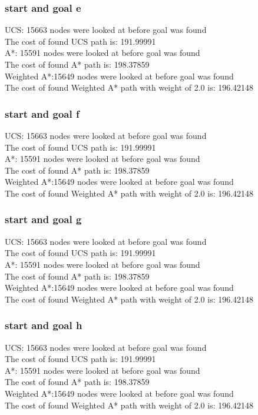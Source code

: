 \documentclass[11pt]{article} %
\begin{document}
\subsubsection{start and goal e}
UCS: 15663 nodes were looked at before goal was found\\
The cost of found UCS path is: 191.99991\\
A*: 15591 nodes were looked at before goal was found\\
The cost of found A* path is: 198.37859\\
Weighted A*:15649 nodes were looked at before goal was found\\
The cost of found Weighted A* path with weight of 2.0 is: 196.42148
\subsubsection{start and goal f}
UCS: 15663 nodes were looked at before goal was found\\
The cost of found UCS path is: 191.99991\\
A*: 15591 nodes were looked at before goal was found\\
The cost of found A* path is: 198.37859\\
Weighted A*:15649 nodes were looked at before goal was found\\
The cost of found Weighted A* path with weight of 2.0 is: 196.42148
\subsubsection{start and goal g}
UCS: 15663 nodes were looked at before goal was found\\
The cost of found UCS path is: 191.99991\\
A*: 15591 nodes were looked at before goal was found\\
The cost of found A* path is: 198.37859\\
Weighted A*:15649 nodes were looked at before goal was found\\
The cost of found Weighted A* path with weight of 2.0 is: 196.42148
\subsubsection{start and goal h}
UCS: 15663 nodes were looked at before goal was found\\
The cost of found UCS path is: 191.99991\\
A*: 15591 nodes were looked at before goal was found\\
The cost of found A* path is: 198.37859\\
Weighted A*:15649 nodes were looked at before goal was found\\
The cost of found Weighted A* path with weight of 2.0 is: 196.42148
\end{document}
